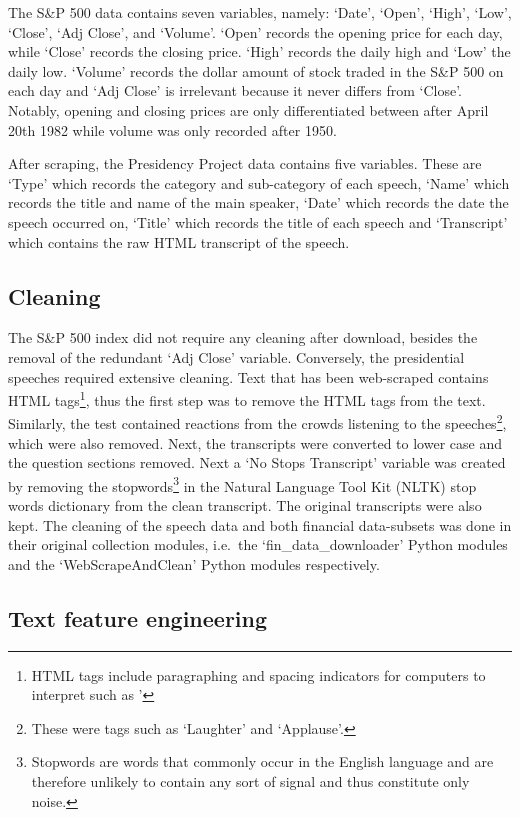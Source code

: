 \documentclass[11pt,preprint, authoryear]{elsarticle}
\numberwithin{equation}{section}
\numberwithin{figure}{section}
\numberwithin{table}{section}
\let\rmarkdownfootnote\footnote%
\def\footnote{\protect\rmarkdownfootnote}
\begin{document}
The S\&P 500 data contains seven variables, namely: `Date', `Open',
`High', `Low', `Close', `Adj Close', and `Volume'. `Open' records the
opening price for each day, while `Close' records the closing price.
`High' records the daily high and `Low' the daily low. `Volume' records
the dollar amount of stock traded in the S\&P 500 on each day and `Adj
Close' is irrelevant because it never differs from `Close'. Notably,
opening and closing prices are only differentiated between after April
20th 1982 while volume was only recorded after 1950.

After scraping, the Presidency Project data contains five variables.
These are `Type' which records the category and sub-category of each
speech, `Name' which records the title and name of the main speaker,
`Date' which records the date the speech occurred on, `Title' which
records the title of each speech and `Transcript' which contains the raw
HTML transcript of the speech.

\hypertarget{cleaning}{%
\subsection{Cleaning}\label{cleaning}}

The S\&P 500 index did not require any cleaning after download, besides
the removal of the redundant `Adj Close' variable. Conversely, the
presidential speeches required extensive cleaning. Text that has been
web-scraped contains HTML tags\footnote{HTML tags include paragraphing
  and spacing indicators for computers to interpret such as '}, thus the
first step was to remove the HTML tags from the text. Similarly, the
test contained reactions from the crowds listening to the
speeches\footnote{These were tags such as `Laughter' and `Applause'.},
which were also removed. Next, the transcripts were converted to lower
case and the question sections removed. Next a `No Stops Transcript'
variable was created by removing the stopwords\footnote{Stopwords are
  words that commonly occur in the English language and are therefore
  unlikely to contain any sort of signal and thus constitute only noise.}
in the Natural Language Tool Kit (NLTK) stop words dictionary from the
clean transcript. The original transcripts were also kept. The cleaning
of the speech data and both financial data-subsets was done in their
original collection modules, i.e.~the `fin\_data\_downloader' Python
modules and the `WebScrapeAndClean' Python modules respectively.

\hypertarget{text-feature-engineering}{%
\subsection{Text feature engineering}\label{text-feature-engineering}}
\end{document}
